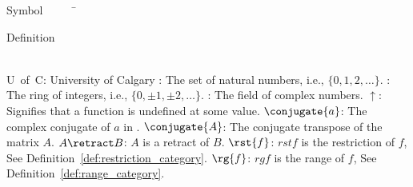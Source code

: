 


\begin{tabbing}
Symbol~~~~~\= \ \ \ \ \ \ \ \ \ \ \ \ \ \ \ \ \ \ \ \ \ \ \ \ \ \ \ \ \ \ \ \ \ \ \ \  \parbox{5in}{Definition}\\

\addsymbol \mbox{U of C}: {University of Calgary}
\addsymbol \mbox{\nat}: {The set of natural numbers, i.e., $\{0,1,2,\ldots\}$.}
\addsymbol \mbox{\integers}: {The ring of integers, i.e., $\{0,\pm1,\pm2,\ldots\}$.}
\addsymbol \mbox{\complex}: {The field of complex numbers.}
\addsymbol \mbox{$\uparrow$}: {Signifies that a function is undefined at some value.}
\addsymbol \mbox{$\conjugate{a}$}: {The complex conjugate of $a$ in \complex.}
\addsymbol \mbox{$\conjugate{A}$}: {The conjugate transpose of the matrix $A$.}
\addsymbol \mbox{$A\retract B$}: {$A$ is a retract of $B$.}
\addsymbol \mbox{$\rst{f}$}: {$rst{f}$ is the restriction of $f$, See Definition~\ref{def:restriction_category}.}
\addsymbol \mbox{$\rg{f}$}: {$rg{f}$ is the range of $f$, See Definition~\ref{def:range_category}.}
\end{tabbing}

